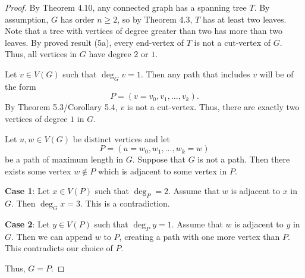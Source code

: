 \documentclass[12pt]{article}
\begin{document}
\begin{proof}
By Theorem 4.10, any connected graph has a spanning tree $T$. By assumption, $G$ has order $n \geq 2$, so by Theorem 4.3, $T$ has at least two leaves. Note that a tree with vertices of degree greater than two has more than two leaves. By proved result (5a), every end-vertex of $T$ is not a cut-vertex of $G$. Thus, all vertices in $G$ have degree $2$ or $1$.

Let $v \in V(G)$ such that $\deg_G v = 1$. Then any path that includes $v$ will be of the form
\[
P = (v = v_0, v_1, \dots, v_k).
\]
By Theorem 5.3/Corollary 5.4, $v$ is not a cut-vertex. Thus, there are exactly two vertices of degree $1$ in $G$.

Let $u,w \in V(G)$ be distinct vertices and let
\[
P = (u = w_0, w_1, \dots, w_k = w)
\]
be a path of maximum length in $G$. Suppose that $G$ is not a path. Then there exists some vertex $w \not\in P$ which is adjacent to some vertex in $P$.

\textbf{Case 1}: Let $x \in V(P)$ such that $\deg_P = 2$. Assume that $w$ is adjacent to $x$ in $G$. Then $\deg_G x = 3$. This is a contradiction.

\textbf{Case 2}: Let $y \in V(P)$ such that $\deg_P y = 1$. Assume that $w$ is adjacent to $y$ in $G$. Then we can append $w$ to $P$, creating a path with one more vertex than $P$. This contradicts our choice of $P$.

Thus, $G = P$.
\end{proof}
\end{document}
